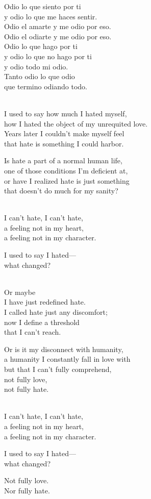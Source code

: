 \begin{lyrics}
Odio lo que siento por ti\\
y odio lo que me haces sentir.\\
Odio el amarte y me odio por eso.\\
Odio el odiarte y me odio por eso.\\
Odio lo que hago por ti\\
y odio lo que no hago por ti\\
y odio todo mi odio.\\
Tanto odio lo que odio\\
que termino odiando todo.

\\
I used to say how much I hated myself,\\
how I hated the object of my unrequited love.\\
Years later I couldn't make myself feel\\
that hate is something I could harbor.

Is hate a part of a normal human life,\\
one of those conditions I'm deficient at,\\
or have I realized hate is just something\\
that doesn't do much for my sanity?

\\
I can't hate, I can't hate,\\
a feeling not in my heart,\\
a feeling not in my character.

I used to say I hated—\\
what changed?

\\
Or maybe\\
I have just redefined hate.\\
I called hate just any discomfort;\\
now I define a threshold\\
that I can't reach.

Or is it my disconnect with humanity,\\
a humanity I constantly fall in love with\\
but that I can't fully comprehend,\\
not fully love,\\
not fully hate.

\\
I can't hate, I can't hate,\\
a feeling not in my heart,\\
a feeling not in my character.

I used to say I hated—\\
what changed?

Not fully love.\\
Nor fully hate.
\end{lyrics}

